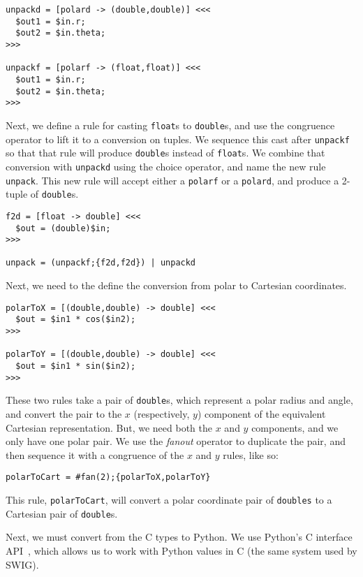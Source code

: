 \begin{verbatim}
unpackd = [polard -> (double,double)] <<<
  $out1 = $in.r;
  $out2 = $in.theta;
>>>

unpackf = [polarf -> (float,float)] <<<
  $out1 = $in.r;
  $out2 = $in.theta;
>>>
\end{verbatim}

Next, we define a rule for casting \texttt{float}s to \texttt{double}s, and use the congruence operator to lift it to a conversion on tuples. We sequence this cast after \texttt{unpackf} so that that rule will produce \texttt{double}s instead of \texttt{float}s. We combine that conversion with \texttt{unpackd} using the choice operator, and name the new rule \texttt{unpack}. This new rule will accept either a \texttt{polarf} or a \texttt{polard}, and produce a 2-tuple of \texttt{double}s.

\begin{verbatim}
f2d = [float -> double] <<<
  $out = (double)$in;
>>>

unpack = (unpackf;{f2d,f2d}) | unpackd
\end{verbatim}

Next, we need to the define the conversion from polar to Cartesian coordinates.

\begin{verbatim}
polarToX = [(double,double) -> double] <<<
  $out = $in1 * cos($in2);  
>>>

polarToY = [(double,double) -> double] <<<
  $out = $in1 * sin($in2);
>>>
\end{verbatim}

These two rules take a pair of \texttt{double}s, which represent a polar radius and angle, and convert the pair to the $x$ (respectively, $y$) component of the equivalent Cartesian representation. But, we need both the $x$ and $y$ components, and we only have one polar pair. We use the \emph{fanout} operator to duplicate the pair, and then sequence it with a congruence of the $x$ and $y$ rules, like so:

\begin{verbatim}
polarToCart = #fan(2);{polarToX,polarToY}
\end{verbatim}

This rule, \texttt{polarToCart}, will convert a polar coordinate pair of \texttt{doubles} to a Cartesian pair of \texttt{double}s.

Next, we must convert from the C types to Python. We use Python's C interface API~\cite{python-c-api}, which allows us to work with Python values in C (the same system used by SWIG).

